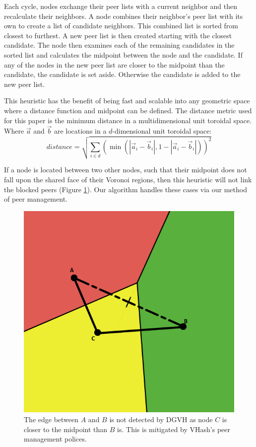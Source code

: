 \documentclass[10pt, conference, letterpaper]{IEEEtran}
\begin{document}
Each cycle, nodes exchange their peer lists with a current neighbor and then recalculate their neighbors.  
A node combines their neighbor's peer list with its own to create a list of candidate neighbors.
This combined list is sorted from closest to furthest.
A new peer list is then created starting with the closest candidate.
The node then examines each of the remaining candidates in the sorted list and calculates the midpoint between the node and the candidate.
If any of the nodes in the new peer list are closer to the midpoint than the candidate, the candidate is set aside.  
Otherwise the candidate is added to the new peer list.

This heuristic has the benefit of being fast and scalable into any geometric space where a distance function and midpoint can be defined.
The distance metric used for this paper is the minimum distance in a multidimensional unit toroidal space.
Where $\vec{a}$ and $\vec{b}$ are locations in a $d$-dimensional unit toroidal space:
\[ distance = \sqrt{\sum\limits_{i\in d} (\min(|\vec{a}_i-\vec{b}_i|, 1-|\vec{a}_i-\vec{b}_i|))^2}\]


If a node is located between two other nodes, such that their midpoint does not fall upon the shared face of their Voronoi regions, then this heuristic will not link the blocked peers  (Figure \ref{occ-ex}).
Our algorithm handles these cases via our method of peer management.

\begin{figure}
	\centering
	\includegraphics[width=\linewidth]{occlusion}
	\caption{The edge between $A$ and $B$ is not detected by DGVH as node $C$ is closer to the midpoint than $B$ is.  This is mitigated by VHash's peer management polices.}  %
	\label{occ-ex}
\end{figure}
\end{document}
